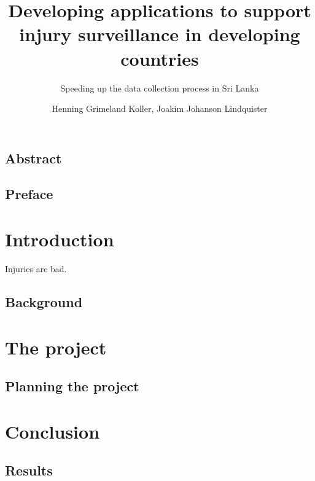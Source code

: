 \documentclass[UKenglish]{ifimaster}  %
\title{Developing applications to support injury
surveillance in developing countries}        %
\subtitle{Speeding
up the data collection process in Sri Lanka}         %
\author{Henning Grimeland Koller, Joakim Johanson Lindquister}                      %
\begin{document}
\ififorside{}
\frontmatter{}
\maketitle{}

\chapter*{Abstract}                   %

\tableofcontents{}
\listoffigures{}
\listoftables{}

\chapter*{Preface}                    %

\mainmatter{}
\part{Introduction}                   %
Injuries are bad.

\chapter{Background}                  %


\part{The project}                    %

\chapter{Planning the project}        %


\part{Conclusion}                     %


\chapter{Results}                     %


\backmatter{}
\printbibliography
\end{document}
